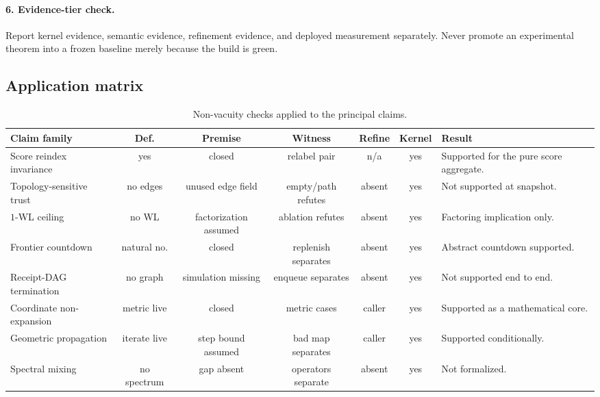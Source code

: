 \documentclass[10pt,letterpaper]{article}
\theoremstyle{definition}
\begin{document}
\paragraph{6. Evidence-tier check.}
Report kernel evidence, semantic evidence, refinement evidence, and deployed
measurement separately. Never promote an experimental theorem into a frozen
baseline merely because the build is green.

\subsection{Application matrix}
\begin{table}[ht]
\centering
\scriptsize
\begin{tabularx}{\textwidth}{@{}L{0.23\textwidth}cccccY@{}}
\toprule
Claim family & Def. & Premise & Witness & Refine & Kernel & Result \\
\midrule
Score reindex invariance & yes & closed & relabel pair & n/a & yes &
Supported for the pure score aggregate. \\
Topology-sensitive trust & no edges & unused edge field & empty/path refutes & absent & yes &
Not supported at snapshot. \\
\(1\)-WL ceiling & no WL & factorization assumed & ablation refutes & absent & yes &
Factoring implication only. \\
Frontier countdown & natural no. & closed & replenish separates & absent & yes &
Abstract countdown supported. \\
Receipt-DAG termination & no graph & simulation missing & enqueue separates & absent & yes &
Not supported end to end. \\
Coordinate non-expansion & metric live & closed & metric cases & caller & yes &
Supported as a mathematical core. \\
Geometric propagation & iterate live & step bound assumed & bad map separates & caller & yes &
Supported conditionally. \\
Spectral mixing & no spectrum & gap absent & operators separate & absent & yes &
Not formalized. \\
\bottomrule
\end{tabularx}
\caption{Non-vacuity checks applied to the principal claims.}
\label{tab:nonvacuity}
\end{table}
\end{document}
